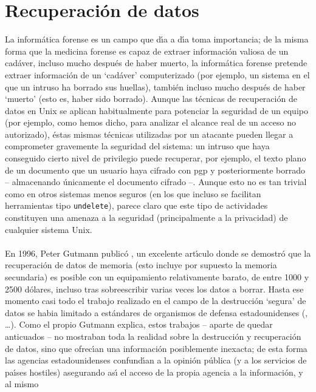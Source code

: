 \section{Recuperaci\'on de datos}
\label{secure-del}
La inform\'atica forense es un campo que d\'{\i}a a d\'{\i}a toma importancia;
de la misma forma que la medicina forense es capaz de extraer informaci\'on
valiosa de un cad\'aver, incluso mucho despu\'es de haber muerto, la 
inform\'atica forense pretende extraer informaci\'on de un `cad\'aver' 
computerizado (por ejemplo, un sistema en el que un intruso ha borrado sus 
huellas), tambi\'en incluso mucho despu\'es de haber `muerto' (esto es, haber
sido borrado). Aunque las t\'ecnicas de recuperaci\'on de datos en Unix se 
aplican habitualmente para potenciar la seguridad de un equipo (por ejemplo, 
como hemos dicho, para analizar el alcance real de un acceso no autorizado), 
\'estas mismas t\'ecnicas utilizadas por un atacante pueden llegar a comprometer
gravemente la seguridad del sistema: un intruso que haya conseguido cierto
nivel de privilegio puede recuperar, por ejemplo, el texto plano de un documento
que un usuario haya cifrado con {\sc pgp} y posteriormente borrado -- 
almacenando \'unicamente el documento cifrado --. Aunque esto no es tan trivial
como en otros sistemas menos seguros (en los que incluso se facilitan 
herramientas tipo {\tt undelete}), parece claro que este tipo de actividades
constituyen una amenaza a la seguridad (principalmente a la privacidad) de
cualquier sistema Unix.\\
\\En 1996, Peter Gutmann public\'o \cite{kn:gut96}, un excelente art\'{\i}culo
donde se demostr\'o que la recuperaci\'on de datos de memoria (esto incluye por
supuesto la memoria secundaria) es posible con un equipamiento relativamente 
barato, de entre 1000 y 2500 d\'olares, incluso tras sobreescribir varias veces
los datos a borrar. Hasta ese momento casi todo el trabajo realizado en el 
campo de la destrucci\'on `segura' de datos se habia limitado a est\'andares
de organismos de defensa estadounidenses (\cite{kn:ncsc91}, 
\cite{kn:nsa85}\ldots). Como el propio Gutmann explica, estos trabajos -- aparte
de quedar anticuados -- no mostraban toda la realidad sobre la destrucci\'on
y recuperaci\'on de datos, sino que ofrec\'{\i}an una informaci\'on posiblemente
inexacta; de esta forma las agencias estadounidenses confund\'{\i}an a la 
opini\'on p\'ublica (y a los servicios de pa\'{\i}ses hostiles) asegurando 
as\'{\i} el acceso de la propia agencia a la informaci\'on, y al mismo 
